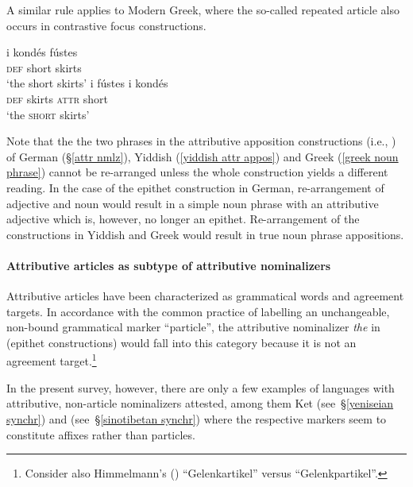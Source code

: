 A similar rule applies to Modern Greek, where the so-called repeated article also occurs in contrastive focus constructions. 
\begin{exe}
\ex
\label{greek noun phrase}
\begin{xlist}
\ex
\gll 	i kondés fústes\\
	\textsc{def} short skirts\\
\glt	‘the short skirts’
\ex 
\gll 	i fústes i kondés\\
	\textsc{def} skirts \textsc{attr} short\\
\glt	‘the \textsc{short} skirts’
\end{xlist}
\end{exe}
Note that the the two phrases in the attributive apposition constructions (i.e., ) of German (\S\ref{attr nmlz}), Yiddish (\ref{yiddish attr appos}) and Greek (\ref{greek noun phrase}) cannot be re-arranged unless the whole construction yields a different reading. In the case of the epithet construction in German, re-arrangement of adjective and noun would result in a simple noun phrase with an attributive adjective which is, however, no longer an epithet. Re-arrangement of the constructions in Yiddish and Greek would result in true noun phrase appositions.

\paragraph*{Attributive articles as subtype of attributive nominalizers}
Attributive articles have been characterized as grammatical words and agreement targets. In accordance with the common practice of labelling an unchangeable, non-bound grammatical marker “particle”, the attributive nominalizer \textit{the} in  (epithet constructions) would fall into this category because it is not an agreement target.\footnote{Consider also Himmelmann's (\citeyear{himmelmann1997}) “Gelenkartikel” versus “Gelenkpartikel”.}

In the present survey, however, there are only a few examples of languages with attributive, non-article nominalizers attested, among them Ket (see~\S\ref{yeniseian synchr}) and  (see~\S\ref{sinotibetan synchr}) where the respective markers seem to constitute affixes rather than particles.

